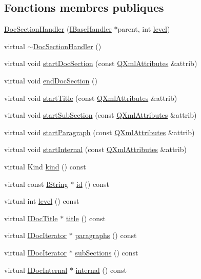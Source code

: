 \subsection*{Fonctions membres publiques}
\begin{DoxyCompactItemize}
\item 
\hyperlink{class_doc_section_handler_a7680a0a87a269ba03cf57d62dca55220}{Doc\+Section\+Handler} (\hyperlink{class_i_base_handler}{I\+Base\+Handler} $\ast$parent, int \hyperlink{class_doc_section_handler_aa25b83702b9d5098500eb3dbead38c62}{level})
\item 
virtual \hyperlink{class_doc_section_handler_a43f82b310a00659b386b947c49ffc945}{$\sim$\+Doc\+Section\+Handler} ()
\item 
virtual void \hyperlink{class_doc_section_handler_a07a328d00eaeb72191e5938b81c29638}{start\+Doc\+Section} (const \hyperlink{class_q_xml_attributes}{Q\+Xml\+Attributes} \&attrib)
\item 
virtual void \hyperlink{class_doc_section_handler_adbc298eb88b24c9f1cb5c2546f472ce7}{end\+Doc\+Section} ()
\item 
virtual void \hyperlink{class_doc_section_handler_aa3df7cfd45a2201e2d1cf67744911b34}{start\+Title} (const \hyperlink{class_q_xml_attributes}{Q\+Xml\+Attributes} \&attrib)
\item 
virtual void \hyperlink{class_doc_section_handler_ac865e9293bd9cd735baf4a98cf4c46df}{start\+Sub\+Section} (const \hyperlink{class_q_xml_attributes}{Q\+Xml\+Attributes} \&attrib)
\item 
virtual void \hyperlink{class_doc_section_handler_a4ea3da121fa3112a0728d187e1f1c2f6}{start\+Paragraph} (const \hyperlink{class_q_xml_attributes}{Q\+Xml\+Attributes} \&attrib)
\item 
virtual void \hyperlink{class_doc_section_handler_a0e82a6c353e8570170195e487c6f91bb}{start\+Internal} (const \hyperlink{class_q_xml_attributes}{Q\+Xml\+Attributes} \&attrib)
\item 
virtual Kind \hyperlink{class_doc_section_handler_a874889c09d8dd0996ccf2a2af877f992}{kind} () const 
\item 
virtual const \hyperlink{class_i_string}{I\+String} $\ast$ \hyperlink{class_doc_section_handler_a2f365e2b3ca7e81a1d5def5475344e8d}{id} () const 
\item 
virtual int \hyperlink{class_doc_section_handler_aa25b83702b9d5098500eb3dbead38c62}{level} () const 
\item 
virtual \hyperlink{class_i_doc_title}{I\+Doc\+Title} $\ast$ \hyperlink{class_doc_section_handler_a6d90c140dec24010834494632fb1f064}{title} () const 
\item 
virtual \hyperlink{class_i_doc_iterator}{I\+Doc\+Iterator} $\ast$ \hyperlink{class_doc_section_handler_a4ebbfebf41fc922289b02bdfc6e9c36c}{paragraphs} () const 
\item 
virtual \hyperlink{class_i_doc_iterator}{I\+Doc\+Iterator} $\ast$ \hyperlink{class_doc_section_handler_afa74776bf5a56bfa6c090e4dfac1da98}{sub\+Sections} () const 
\item 
virtual \hyperlink{class_i_doc_internal}{I\+Doc\+Internal} $\ast$ \hyperlink{class_doc_section_handler_a93430a783a664dac288d7a122b0ba92d}{internal} () const 
\end{DoxyCompactItemize}
